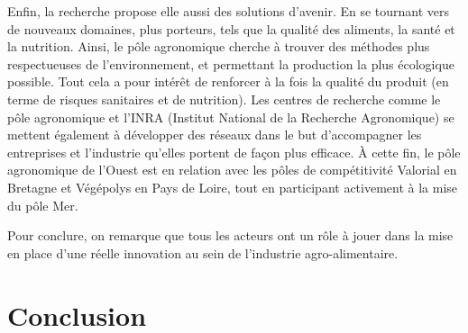 \documentclass[a4paper,10pt]{report}
\begin{document}
			Enfin, la recherche propose elle aussi des solutions d’avenir. En se tournant vers de nouveaux domaines, plus porteurs, tels que la qualité des aliments, la santé et la nutrition. Ainsi, le pôle agronomique cherche à trouver des méthodes plus respectueuses de l’environnement, et permettant la production la plus écologique possible\cite{PoleAgroOuest}. Tout cela a pour intérêt de renforcer à la fois la qualité du produit (en terme de risques sanitaires et de nutrition). Les centres de recherche comme le pôle agronomique et l’INRA (Institut National de la Recherche Agronomique) se mettent également à développer des réseaux dans le but d’accompagner les entreprises et l’industrie qu’elles portent de façon plus efficace. À cette fin, le pôle agronomique de l’Ouest est en relation avec les pôles de compétitivité Valorial en Bretagne et Végépolys en Pays de Loire, tout en participant activement à la mise du pôle Mer\cite{PoleAgroOuest}. 

  			 Pour conclure, on remarque que tous les acteurs ont un rôle à jouer dans la mise en place d’une réelle innovation au sein de l’industrie agro-alimentaire.

\chapter*{Conclusion}

{}
\end{document}
